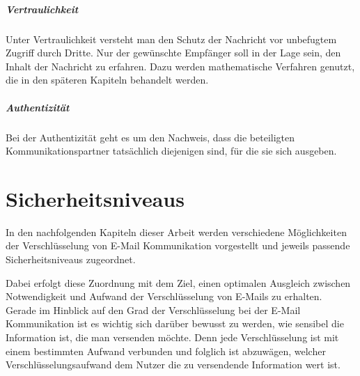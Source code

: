\documentclass  [paper=a4,
				fontsize=12pt,
				listof=totoc,
				bibliography=totoc
				]{scrreprt}
\begin{document}
	\paragraph{Vertraulichkeit}
	
	Unter Vertraulichkeit versteht man den Schutz der Nachricht vor unbefugtem Zugriff durch Dritte. Nur der gewünschte Empfänger soll in der Lage sein, den Inhalt der Nachricht zu erfahren. Dazu werden mathematische Verfahren genutzt, die in den späteren Kapiteln behandelt werden.
	
	\paragraph{Authentizität}
	
	Bei der Authentizität geht es um den Nachweis, dass die beteiligten Kommunikationspartner tatsächlich diejenigen sind, für die sie sich ausgeben.
	
	\chapter{Sicherheitsniveaus}
	
	
		In den nachfolgenden Kapiteln dieser Arbeit werden verschiedene Möglichkeiten der Verschlüsselung von E-Mail Kommunikation vorgestellt und jeweils passende Sicherheitsniveaus zugeordnet. %
		
		Dabei erfolgt diese Zuordnung mit dem Ziel, einen optimalen Ausgleich zwischen Notwendigkeit und Aufwand der Verschlüsselung von E-Mails zu erhalten.
		\medskip\\
		
	
	
		
		Gerade im Hinblick auf den Grad der Verschlüsselung bei der E-Mail Kommunikation ist es wichtig sich darüber bewusst zu werden, wie sensibel die Information ist, die man versenden möchte. Denn jede Verschlüsselung ist mit einem bestimmten Aufwand verbunden und folglich ist abzuwägen, welcher Verschlüsselungsaufwand dem Nutzer die zu versendende Information wert ist. 
		\medskip\\
		
\end{document}
